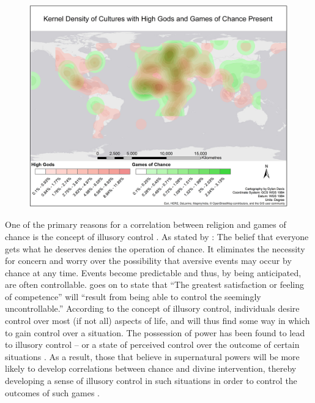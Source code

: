 \documentclass[%
	]{ijsra}
\begin{document}
\begin{figure} [!htb] %
	\includegraphics[width=\linewidth]{figures/Figure5_Davis_082016}
	\caption
	\centering
	\label{fig:Figure5_Davis_082016}
\end{figure}

One of the primary reasons for a correlation between religion and games of chance is the concept of illusory control \parencites[see][]{wohl2002}{langer1975}. As stated by \textcite[312]{langer1975}: 
The belief that everyone gets what he deserves denies the operation of chance. It eliminates the necessity for concern and worry over the possibility that aversive events may occur by chance at any time. Events become predictable and thus, by being anticipated, are often controllable.
\textcite[323]{langer1975} goes on to state that ``The greatest satisfaction or feeling of competence” will ``result from being able to control the seemingly uncontrollable.” According to the concept of illusory control, individuals desire control over most (if not all) aspects of life, and will thus find some way in which to gain control over a situation. The possession of power has been found to lead to illusory control – or a state of perceived control over the outcome of certain situations \parencite{fast2009}. As a result, those that believe in supernatural powers will be more likely to develop correlations between chance and divine intervention, thereby developing a sense of illusory control in such situations in order to control the outcomes of such games \parencite[1089]{tobacyk1991}.
\end{document}
